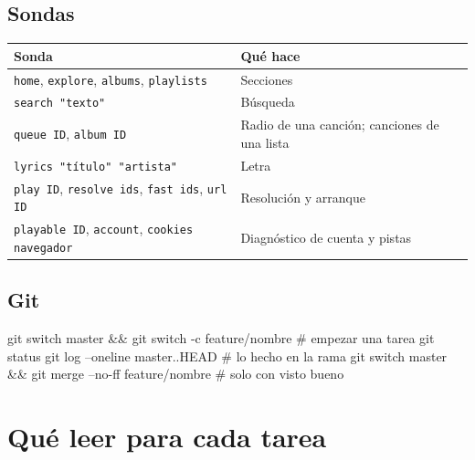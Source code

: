 \subsection{Sondas}

\begin{center}
\small
\begin{tabularx}{\linewidth}{@{}lX@{}}
\toprule
Sonda & Qué hace \\
\midrule
\texttt{home}, \texttt{explore}, \texttt{albums}, \texttt{playlists} & Secciones \\
\texttt{search "texto"} & Búsqueda \\
\texttt{queue ID}, \texttt{album ID} & Radio de una canción; canciones de una lista \\
\texttt{lyrics "título" "artista"} & Letra \\
\texttt{play ID}, \texttt{resolve ids}, \texttt{fast ids}, \texttt{url ID} & Resolución y arranque \\
\texttt{playable ID}, \texttt{account}, \texttt{cookies navegador} & Diagnóstico de cuenta y pistas \\
\bottomrule
\end{tabularx}
\end{center}

\subsection{Git}

\begin{terminal}
git switch master && git switch -c feature/nombre   # empezar una tarea
git status
git log --oneline master..HEAD                      # lo hecho en la rama
git switch master && git merge --no-ff feature/nombre   # solo con visto bueno
\end{terminal}

\section{Qué leer para cada tarea}

